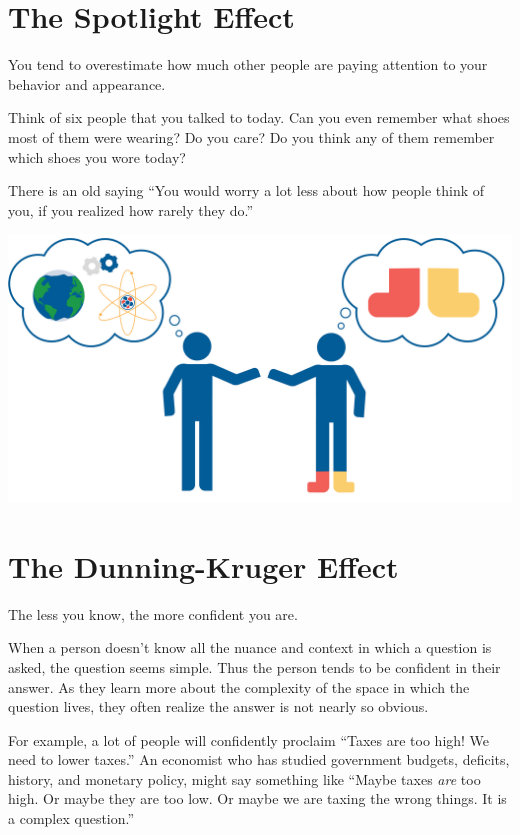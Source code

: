 \section{The Spotlight Effect}

You tend to overestimate how much other people are paying attention to
your behavior and appearance.

Think of six people that you talked to today. Can you even remember what
shoes most of them were wearing? Do you care? Do you think any of them
remember which shoes you wore today?

There is an old saying ``You would worry a lot less about how people
think of you, if you realized how rarely they do.''

\includegraphics[width=1\textwidth]{spotlightEffect.png}

\section{The Dunning-Kruger Effect}

The less you know, the more confident you are.

When a person doesn't know all the nuance and context in which a question is
asked, the question seems simple. Thus the person tends to be confident in
their answer. As they learn more about the complexity of the space in
which the question lives, they often realize the answer is not nearly so
obvious.

For example, a lot of people will confidently proclaim ``Taxes are too
high! We need to lower taxes.''  An economist who has studied
government budgets, deficits, history, and monetary policy, might say
something like ``Maybe taxes \emph{are} too high. Or maybe they are
too low. Or maybe we are taxing the wrong things. It is a 
complex question.''

